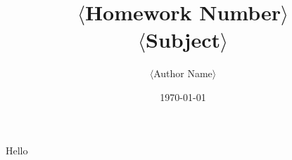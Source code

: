 \documentclass{article}
\title{\Huge$\langle$Homework Number$\rangle$
	\\
	\Large$\langle$Subject$\rangle$}
\author{$\langle$Author Name$\rangle$}
\date{\today}
\begin{document}
\maketitle
	
Hello
\end{document}
